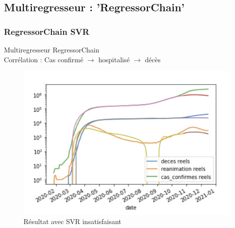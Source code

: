 \documentclass{beamer}
\begin{document}
\subsection{Multiregresseur : 'RegressorChain'}
\begin{frame}%
	\frametitle{RegressorChain SVR}
	Multiregresseur RegressorChain\\ Corrélation : Cas confirmé $\rightarrow$ hospitalisé $\rightarrow$ décès 
	
	\begin{figure}[h]
		\includegraphics[scale=0.43]{mulitregr_epic_fail}
		\caption{Résultat avec SVR insatisfaisant}
	\end{figure}
\end{frame}
\end{document}
